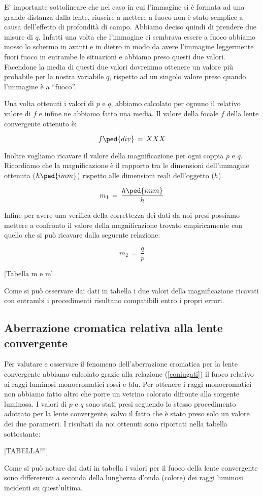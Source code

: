 E' importante sottolineare che nel caso in cui l'immagine si è formata ad una grande distanza dalla lente, riuscire a mettere a fuoco non è stato semplice a causa dell'effetto di profondità di campo. Abbiamo deciso quindi di prendere due misure di $q$. Infatti una volta che l'immagine ci sembrava essere a fuoco abbiamo mosso lo schermo in avanti e in dietro in modo da avere l'immagine leggermente fuori fuoco in entrambe le situazioni e abbiamo preso questi due valori. Facendone la media di questi due valori dovremmo ottenere un valore più probabile per la nostra variabile $q$, rispetto ad un singolo valore preso quando l'immagine è a ``fuoco''.

Una volta ottenuti i valori  di $p$ e $q$, abbiamo calcolato per ognuno il relativo valore di $f$ e infine ne abbiamo fatto una media.
Il valore della focale $f$ della lente convergente ottenuto è:

\begin{equation}
	f \ped{div} \,=\, XXX
\end{equation}

Inoltre vogliamo ricavare il valore della magnificazione per ogni coppia $p$ e $q$. Ricordiamo che la magnificazione è il rapporto tra le dimensioni dell'immagine ottenuta ($h \ped{imm}$) rispetto alle dimensioni reali dell'oggetto ($h$).

\begin{equation}
	m_{1} \,=\, \frac{h \ped{imm}}{h}
\end{equation}

Infine per avere una verifica della correttezza dei dati da noi presi possiamo mettere a confronto il valore della magnificazione trovato empiricamente con quello che si può ricavare dalla seguente relazione:

\begin{equation}
	m_{2} \,=\, \frac{q}{p}
\end{equation}

[Tabella m e m\']

Come si può osservare dai dati in tabella i due valori della magnificazione ricavati con entrambi i procedimenti risultano compatibili entro i propri errori. 

\subsection{Aberrazione cromatica relativa alla lente convergente}

Per valutare e osservare il fenomeno dell'aberrazione cromatica per la lente convergente abbiamo calcolato grazie alla relazione (\ref{coniugati}) il fuoco relativo ai raggi luminosi monocromatici rossi e blu. Per ottenere i raggi monocromatici non abbiamo fatto altro che porre un vetrino colorato difronte alla sorgente luminosa. I valori di $p$ e $q$ sono stati presi seguendo lo stesso procedimento adottato per la lente convergente, salvo il fatto che è stato preso solo un valore dei due parametri.
I risultati da noi ottenuti sono riportati nella tabella sottostante:

[TABELLA!!!]

Come si può notare dai dati in tabella i valori per il fuoco della lente convergente sono differerenti a seconda della lunghezza d'onda (colore) dei raggi luminosi incidenti su quest'ultima. 









